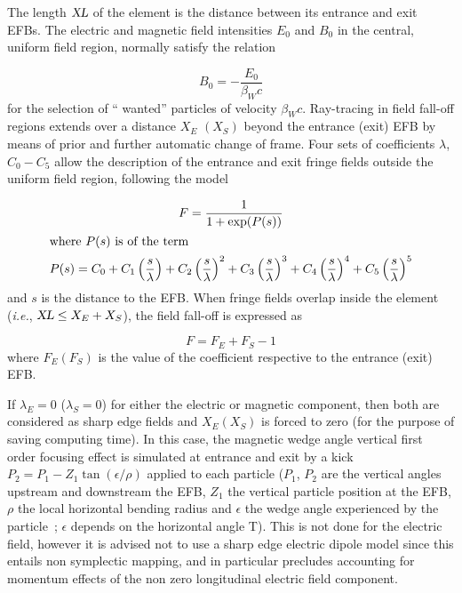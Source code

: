 \noindent The length $ \textsl{XL} $ of the element is the distance between its
entrance and exit EFBs. The electric and magnetic field intensities $ E_0 $ and $ B_0 $ in the 
central, uniform field region, normally satisfy the relation
 
 $$ B_0= - \dfrac{E_0 }{ \beta_ Wc} $$
%
 for the selection of `` wanted''  particles of velocity $\beta_Wc $. Ray-tracing in 
field fall-off regions extends over a distance $ X_E $ $ (X_S) $ beyond the
entrance (exit) EFB by means of prior and further automatic change of frame. Four sets
of coefficients $\lambda$, $ C_0-C_5 $ allow the description of the entrance and exit fringe 
fields outside the uniform field region, following the model~\cite{Biblio12} %

\begin{gather*}
	F = \dfrac{1 }{ 1+ \exp(P(s))} \\
	\intertext{where $  P(s) $ is of the term}
	    P(s) = C_0
	       +C_1 \left(  \dfrac{s }{ \lambda} \right) 
	       +C_2 \left( \dfrac{s }{ \lambda} \right)^2 
	       + C_3 \left( \dfrac{s }{ \lambda} \right)^3 
	       +C_4 \left( \dfrac{s }{ \lambda} \right)^4 
	       + C_5 \left(\dfrac{s }{ \lambda} \right)^5 
\end{gather*}
%
and $ s $ is the distance to the EFB.  When fringe fields overlap
inside the element (\emph{i.e.}, $ \textsl{XL}\leq X_E+X_S$),  the field fall-off is expressed as

$$ F = F_E + F_S -1 $$
%
 where $ F_E(F_S) $ is the value of the coefficient respective to the entrance (exit) EFB. 
 
\noindent If $ \lambda_ E=0 $  ($\lambda_ S=0$)  for either the electric or
magnetic component, then both are considered as sharp edge fields and $ X_E(X_S) $ is forced 
to zero (for the purpose of saving computing time).  In this case, the magnetic wedge angle vertical first order focusing effect is simulated at entrance and exit by a kick $P_2 = P_1 - Z_1 \tan (\epsilon / \rho)$ applied to each particle ($P_1$, $P_2$ are the vertical angles upstream and downstream the EFB, $Z_1$ the vertical particle position at the EFB, $\rho$ the local horizontal bending radius and $\epsilon$ the wedge angle experienced by the particle~; $\epsilon$ depends on the horizontal angle T). This is not done for the electric field, however it is advised not to use a sharp edge electric dipole model since this entails non symplectic mapping, and in particular precludes accounting for momentum effects of the non zero longitudinal electric field component.

